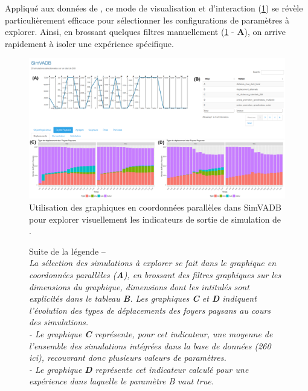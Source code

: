 Appliqué aux données de \simfeodal{}, ce mode de visualisation et d'interaction (\cref{fig:simvadb_dashboard}) se révèle particulièrement efficace pour sélectionner les configurations de paramètres à explorer.
Ainsi, en \og brossant \fg{} quelques filtres manuellement (\cref{fig:simvadb_dashboard} - \textbf{A}), on arrive rapidement à isoler une expérience spécifique.

\begin{figure}[H]
	\centering
	\captionsetup{width=\linewidth}
	\includegraphics[height=.78\linewidth,angle=90]{img/SimVADB_Dashboard2_annote_retouche.png}
	\caption[Utilisation des graphiques en coordonnées parallèles dans SimVADB pour explorer visuellement les indicateurs de sortie de simulation de \simfeodal{}.]{Utilisation des graphiques en coordonnées parallèles dans SimVADB pour explorer visuellement les indicateurs de sortie de simulation de \simfeodal{}.}
	\label{fig:simvadb_dashboard}
\end{figure}
\clearpage

\addtocounter{figure}{-1}
\begin{figure}[H]
	\vspace*{2em}\caption[exemple]{Suite de la légende --\\
\textit{La sélection des simulations à explorer se fait dans le graphique en coordonnées parallèles (\textbf{A}), en \og brossant\fg{} des filtres graphiques sur les \og dimensions\fg{} du graphique, dimensions dont les intitulés sont explicités dans le tableau \textbf{B}.	Les graphiques \textbf{C} et \textbf{D} indiquent l'évolution des types de déplacements des foyers paysans au cours des simulations.\\
- Le graphique \textbf{C} représente, pour cet indicateur, une moyenne de l'ensemble des simulations intégrées dans la base de données (260 ici), recouvrant donc plusieurs valeurs de paramètres.\\
- Le graphique \textbf{D} représente cet indicateur calculé pour une expérience dans laquelle le paramètre \og \textsf{B} \fg{} vaut \textsf{true}.}	
}
\end{figure}

